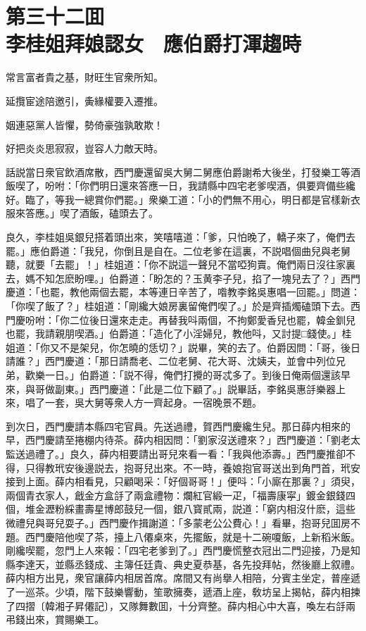 
\chapter*{第三十二囬　\\李桂姐拜娘認女　應伯爵打渾趨時}


\begin{myquote}
常言富者貴之基，財旺生官衆所知。

延攬宦途陪邀引，夤緣權要入遷推。

姻連惡黨人皆懼，勢倚豪強孰敢欺！

好把炎炎思寂寂，豈容人力敵天時。
\end{myquote}

話説當日衆官飲酒席散，西門慶還留吳大舅二舅應伯爵謝希大後坐，打發樂工等酒飯喫了，吩咐：「你們明日還來答應一日，我請縣中四宅老爹喫酒，俱要齊備些纔好。臨了，等我一總賞你們罷。」衆樂工道：「小的們無不用心，明日都是官樣新衣服來答應。」喫了酒飯，磕頭去了。

良久，李桂姐吳銀兒搭着頭出來，笑嘻嘻道：「爹，只怕晚了，轎子來了，俺們去罷。」應伯爵道：「我兒，你倒且是自在。二位老爹在這裏，不説唱個曲兒與老舅聽，就要「去罷」！」桂姐道：「你不説這一聲兒不當啞狗賣。俺們兩日沒往家裏去，媽不知怎麽盼哩。」伯爵道：「盼怎的？玉黄李子兒，掐了一塊兒去了？」西門慶道：「也罷，教他兩個去罷，本等連日辛苦了，喒教李銘吳惠唱一回罷。」問道：「你喫了飯了？」桂姐道：「剛纔大娘房裏留俺們喫了。」於是齊插燭磕頭下去。西門慶吩咐：「你二位後日還來走走。再替我呌兩個，不拘鄭愛香兒也罷，韓金釧兒也罷，我請親朋喫酒。」伯爵道：「造化了小淫婦兒，教他呌，又討提□錢使。」桂姐道：「你又不是架兒，你怎曉的恁切？」説畢，笑的去了。伯爵因問：「哥，後日請誰？」西門慶道：「那日請喬老、二位老舅、花大哥、沈姨夫，並會中列位兄弟，歡樂一日。」伯爵道：「説不得，俺們打攪的哥忒多了。到後日俺兩個還該早來，與哥做副東。」西門慶道：「此是二位下顧了。」説畢話，李銘吳惠㧱樂器上來，唱了一套，吳大舅等衆人方一齊起身。一宿晚景不題。

到次日，西門慶請本縣四宅官員。先送過禮，賀西門慶纔生兒。那日薛内相來的早，西門慶請至捲棚内待茶。薛内相因問：「劉家沒送禮來？」西門慶道：「劉老太監送過禮了。」良久，薛内相要請出哥兒來看一看：「我與他添壽。」西門慶推卻不得，只得教玳安後邊説去，抱哥兒出來。不一時，養娘抱官哥送出到角門首，玳安接到上面。薛内相看見，只顧喝采：「好個哥哥！」便呌：「小廝在那裏？」須臾，兩個青衣家人，戧金方盒㧱了兩盒禮物：爛紅官緞一疋，「福壽康寜」鍍金銀錢四個，堆金瀝粉綵畫壽星博郎鼓兒一個，銀八寳貳兩，説道：「窮内相沒什麽，這些微禮兒與哥兒耍子。」西門慶作揖謝道：「多蒙老公公費心！」看畢，抱哥兒囬房不題。西門慶陪他喫了茶，擡上八僊桌來，先擺飯，就是十二碗嗄飯，上新稻米飯。剛纔喫罷，忽門上人來報：「四宅老爹到了。」西門慶慌整衣冠出二門迎接，乃是知縣李達天，並縣丞錢成、主簿任廷貴、典史夏恭基，各先投拜帖，然後廳上叙禮。薛内相方出見，衆官讓薛内相居首席。席間又有尚擧人相陪，分賓主坐定，普座遞了一巡茶。少頃，階下鼓樂響動，笙歌擁奏，遞酒上座，敎坊呈上揭帖，薛内相揀了四摺〔韓湘子昇僊記〕，又隊舞數囬，十分齊整。薛内相心中大喜，喚左右㧱兩弔錢出來，賞賜樂工。

